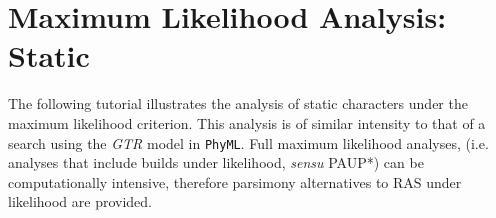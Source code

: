 


\section{Maximum Likelihood Analysis: Static}{\label{tutorial12}}

The following tutorial illustrates the analysis of static characters under the maximum likelihood criterion.  This analysis 
is of similar intensity to that of a search using the \emph{GTR} model in \texttt{PhyML}.  Full maximum likelihood analyses, 
(i.e. analyses that include builds under likelihood, \textit{sensu} PAUP*) can be computationally intensive, 
therefore parsimony alternatives to RAS under likelihood are provided. 

